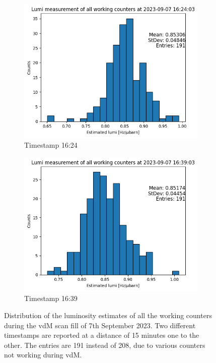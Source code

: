 \begin{figure}
    \centering
    \begin{subfigure}{0.48\textwidth}
    \includegraphics[width=\linewidth]{figures/lumi_hist_1624.png}
    \caption{Timestamp 16:24}\label{fig:lumi1624}
    \end{subfigure}
    \begin{subfigure}{0.48\textwidth}
    \includegraphics[width=\linewidth]{figures/lumi_hist_1639.png}
    \caption{Timestamp 16:39}\label{fig:lumi1639}
    \end{subfigure}
    \caption{Distribution of the luminosity estimates of all the working counters during the vdM scan fill of 7th September 2023. Two different timestamps are reported at a distance of 15 minutes one to the other. The entries are 191 instead of 208, due to various counters not working during vdM.}
    \label{fig:lumi_hist_ts}
\end{figure}

